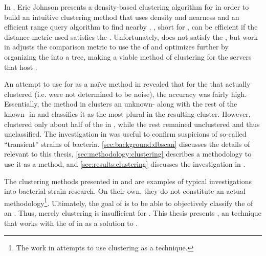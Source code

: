 In \cite{johnson2015density}, Eric Johnson presents a density-based clustering algorithm for \pyros{} in order to build an intuitive clustering method that uses density and nearness and an efficient range query algorithm to find nearby \isols{}.
\dbscan{} \cite{ester1996density}, short for \dbscanlong{}, can be efficient if the distance metric used satisfies the \trieq{}.
Unfortunately, \pearson{} does not satisfy the \trieq{}, but work in \cite{johnson2015density} adjusts the comparison metric to use the \euclid{} of \zscores{} and optimizes further by organizing the \pyros{} into a tree, making \dbscan{} a viable method of clustering for the servers that host \cplop{}.

An attempt to use \dbscan{} for \cplop{} \isols{} \cite{johnson2015density} as a na{\"i}ve \mst{} method in \cite{DBLP:conf/bcb/McGovernJDBKV16} revealed that for the \isols{} that actually clustered (i.e. were not determined to be noise), the accuracy was fairly high.
Essentially, the \mst{} method in \cite{DBLP:conf/bcb/McGovernJDBKV16} clusters an unknown-\spec{} \isol{} along with the rest of the known-\spec{} \isols{} in \cplop{} and classifies it as the most plural \spec{} in the resulting cluster.
However, \cite{johnson2015density} clustered only about half of the \isols{} in \cplop{}, while the rest remained unclustered and thus unclassified.
The investigation in \cite{DBLP:conf/bcb/McGovernJDBKV16} was useful to confirm suspicions of so-called ``transient'' strains of \ecoli{} bacteria.
\autoref{sec:background:dbscan} discusses the details of \cite{johnson2015density} relevant to this thesis, \autoref{sec:methodology:clustering} describes a methodology to use it as a \mst{} method, and \autoref{sec:results:clustering} discusses the investigation in \cite{DBLP:conf/bcb/McGovernJDBKV16}.

The clustering methods presented in \cite{montana2013algorithms, montana2013ontological, DBLP:conf/bibm/MontanaDNBK11, montana2012investigating, SolimanDVMBNWKG12} and \cite{johnson2015density} are examples of typical investigations into bacterial strain research.
On their own, they do not constitute an actual \mst{} methodology\footnote{The work in \cite{DBLP:conf/bcb/McGovernJDBKV16} attempts to use clustering as a \mst{} technique.}.
Ultimately, the goal of \cplop{} is to be able to objectively classify the \spec{} of an \ecoli{} \isol{}.
Thus, merely clustering \isols{} is insufficient for \mst{}.
This thesis presents \krap{}, an \mst{} technique that works with the \pyros{} of \isols{} in \cplop{} as a solution to \mst{}.

